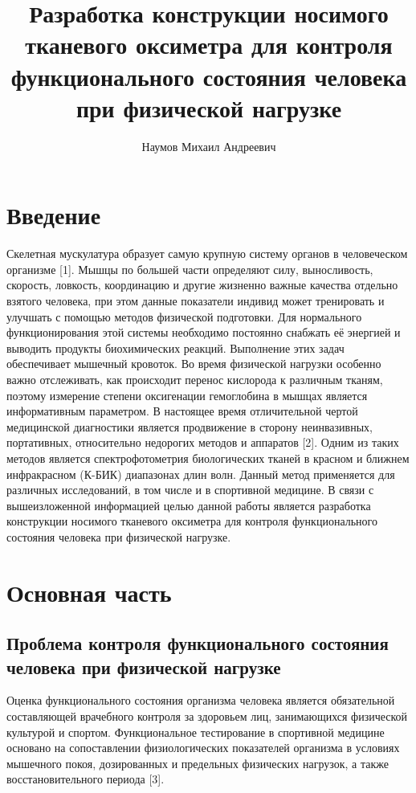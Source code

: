 \documentclass[11pt]{article} %
\title{Разработка конструкции носимого тканевого оксиметра для контроля функционального состояния человека при физической нагрузке}
\author{Наумов Михаил Андреевич}
\begin{document}
\maketitle
\newpage
\tableofcontents
\clearpage

\section{Введение}
Скелетная мускулатура образует самую крупную систему органов в человеческом организме [1]. Мышцы по большей части определяют силу, выносливость, скорость, ловкость, координацию и другие жизненно важные качества отдельно взятого человека, при этом данные показатели индивид может тренировать и улучшать с помощью методов физической подготовки. Для нормального функционирования этой системы необходимо постоянно снабжать её энергией и выводить продукты биохимических реакций. Выполнение этих задач обеспечивает мышечный кровоток. Во время физической нагрузки особенно важно отслеживать, как происходит перенос кислорода к различным тканям, поэтому измерение степени оксигенации гемоглобина в мышцах является информативным параметром.
В настоящее время отличительной чертой медицинской диагностики является продвижение в сторону неинвазивных, портативных, относительно недорогих методов и аппаратов [2]. Одним из таких методов является спектрофотометрия биологических тканей в красном и ближнем инфракрасном (К-БИК) диапазонах длин волн. Данный метод применяется для различных исследований, в том числе и в спортивной медицине.
В связи с вышеизложенной информацией целью данной работы является разработка конструкции носимого тканевого оксиметра для контроля функционального состояния человека при физической нагрузке.

\section{Основная часть}
\subsection{Проблема контроля функционального состояния человека при физической нагрузке}

Оценка функционального состояния организма человека является обязательной составляющей врачебного контроля за здоровьем лиц, занимающихся физической культурой и спортом. Функциональное тестирование в спортивной медицине основано на сопоставлении физиологических показателей организма в условиях мышечного покоя, дозированных и предельных физических нагрузок, а также восстановительного периода [3].
\end{document}
